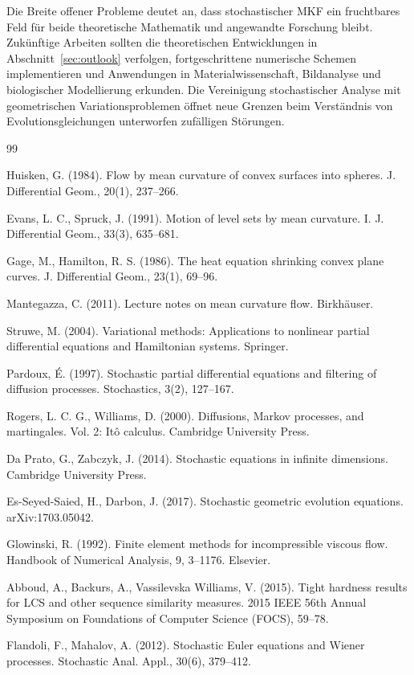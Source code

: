 \documentclass[a4paper,12pt]{article}
\theoremstyle{definition}
\begin{document}
Die Breite offener Probleme deutet an, dass stochastischer MKF ein fruchtbares Feld für beide theoretische Mathematik und angewandte Forschung bleibt. Zukünftige Arbeiten sollten die theoretischen Entwicklungen in Abschnitt~\ref{sec:outlook} verfolgen, fortgeschrittene numerische Schemen implementieren und Anwendungen in Materialwissenschaft, Bildanalyse und biologischer Modellierung erkunden. Die Vereinigung stochastischer Analyse mit geometrischen Variationsproblemen öffnet neue Grenzen beim Verständnis von Evolutionsgleichungen unterworfen zufälligen Störungen.

\begin{thebibliography}{99}

 Huisken, G. (1984). Flow by mean curvature of convex surfaces into spheres. J. Differential Geom., 20(1), 237--266.

 Evans, L. C., Spruck, J. (1991). Motion of level sets by mean curvature. I. J. Differential Geom., 33(3), 635--681.

 Gage, M., Hamilton, R. S. (1986). The heat equation shrinking convex plane curves. J. Differential Geom., 23(1), 69--96.

 Mantegazza, C. (2011). Lecture notes on mean curvature flow. Birkhäuser.

 Struwe, M. (2004). Variational methods: Applications to nonlinear partial differential equations and Hamiltonian systems. Springer.

 Pardoux, É. (1997). Stochastic partial differential equations and filtering of diffusion processes. Stochastics, 3(2), 127--167.

 Rogers, L. C. G., Williams, D. (2000). Diffusions, Markov processes, and martingales. Vol. 2: Itô calculus. Cambridge University Press.

 Da Prato, G., Zabczyk, J. (2014). Stochastic equations in infinite dimensions. Cambridge University Press.

 Es-Seyed-Saied, H., Darbon, J. (2017). Stochastic geometric evolution equations. arXiv:1703.05042.

 Glowinski, R. (1992). Finite element methods for incompressible viscous flow. Handbook of Numerical Analysis, 9, 3--1176. Elsevier.

 Abboud, A., Backurs, A., Vassilevska Williams, V. (2015). Tight hardness results for LCS and other sequence similarity measures. 2015 IEEE 56th Annual Symposium on Foundations of Computer Science (FOCS), 59--78.

 Flandoli, F., Mahalov, A. (2012). Stochastic Euler equations and Wiener processes. Stochastic Anal. Appl., 30(6), 379--412.

\end{thebibliography}
\end{document}

